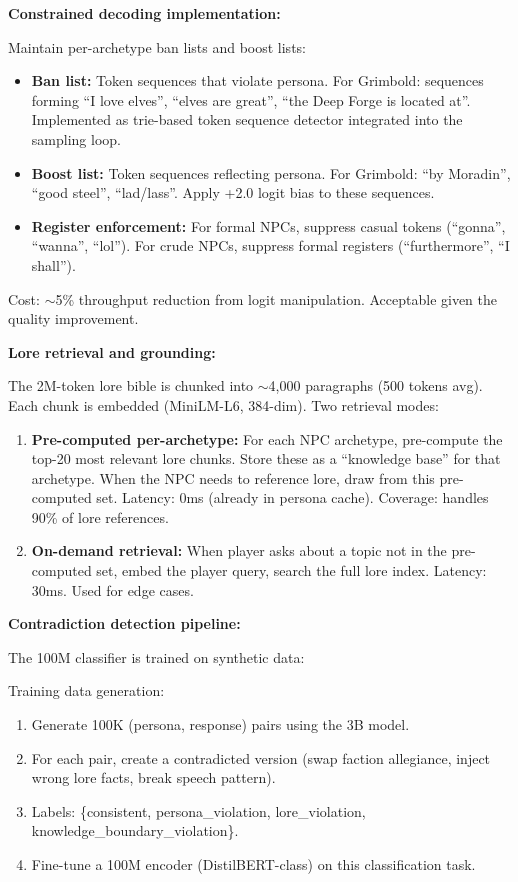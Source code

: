 \bigskip
\textbf{Constrained decoding implementation:}

Maintain per-archetype ban lists and boost lists:
\begin{itemize}
  \item \textbf{Ban list:} Token sequences that violate persona. For Grimbold: sequences forming ``I love elves'', ``elves are great'', ``the Deep Forge is located at''. Implemented as trie-based token sequence detector integrated into the sampling loop.
  \item \textbf{Boost list:} Token sequences reflecting persona. For Grimbold: ``by Moradin'', ``good steel'', ``lad/lass''. Apply +2.0 logit bias to these sequences.
  \item \textbf{Register enforcement:} For formal NPCs, suppress casual tokens (``gonna'', ``wanna'', ``lol''). For crude NPCs, suppress formal registers (``furthermore'', ``I shall'').
\end{itemize}

Cost: $\sim$5\% throughput reduction from logit manipulation. Acceptable given the quality improvement.

\textbf{Lore retrieval and grounding:}

The 2M-token lore bible is chunked into $\sim$4,000 paragraphs (500 tokens avg). Each chunk is embedded (MiniLM-L6, 384-dim). Two retrieval modes:

\begin{enumerate}
  \item \textbf{Pre-computed per-archetype:} For each NPC archetype, pre-compute the top-20 most relevant lore chunks. Store these as a ``knowledge base'' for that archetype. When the NPC needs to reference lore, draw from this pre-computed set. Latency: 0ms (already in persona cache). Coverage: handles 90\% of lore references.
  \item \textbf{On-demand retrieval:} When player asks about a topic not in the pre-computed set, embed the player query, search the full lore index. Latency: 30ms. Used for edge cases.
\end{enumerate}

\textbf{Contradiction detection pipeline:}

The 100M classifier is trained on synthetic data:

Training data generation:
\begin{enumerate}
  \item Generate 100K (persona, response) pairs using the 3B model.
  \item For each pair, create a contradicted version (swap faction allegiance, inject wrong lore facts, break speech pattern).
  \item Labels: \{consistent, persona\_violation, lore\_violation, knowledge\_boundary\_violation\}.
  \item Fine-tune a 100M encoder (DistilBERT-class) on this classification task.
\end{enumerate}

